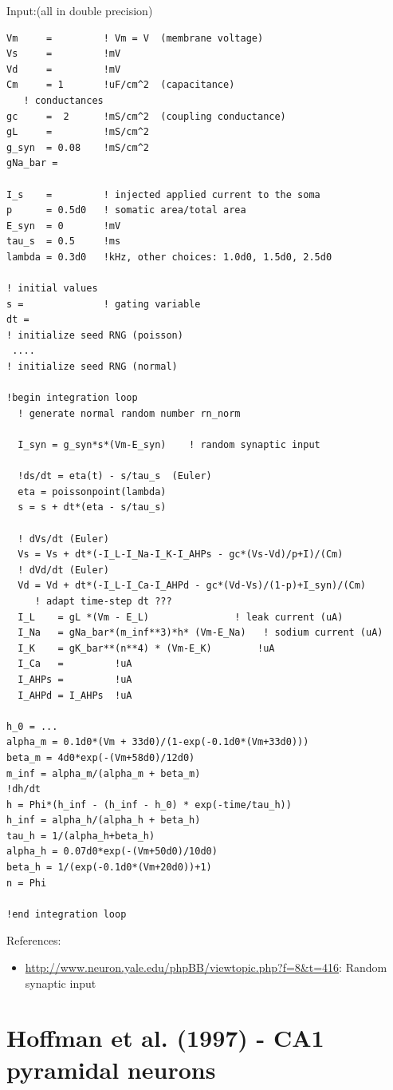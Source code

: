 Input:(all in double precision)
\begin{verbatim}
Vm     =         ! Vm = V  (membrane voltage)
Vs     =         !mV
Vd     =         !mV
Cm     = 1       !uF/cm^2  (capacitance)
   ! conductances
gc     =  2      !mS/cm^2  (coupling conductance)
gL     =         !mS/cm^2
g_syn  = 0.08    !mS/cm^2
gNa_bar =

I_s    =         ! injected applied current to the soma
p      = 0.5d0   ! somatic area/total area
E_syn  = 0       !mV
tau_s  = 0.5     !ms
lambda = 0.3d0   !kHz, other choices: 1.0d0, 1.5d0, 2.5d0

! initial values
s =              ! gating variable
dt = 
! initialize seed RNG (poisson)
 ....
! initialize seed RNG (normal)

!begin integration loop
  ! generate normal random number rn_norm
  
  I_syn = g_syn*s*(Vm-E_syn)    ! random synaptic input

  !ds/dt = eta(t) - s/tau_s  (Euler)
  eta = poissonpoint(lambda)  
  s = s + dt*(eta - s/tau_s)

  ! dVs/dt (Euler)
  Vs = Vs + dt*(-I_L-I_Na-I_K-I_AHPs - gc*(Vs-Vd)/p+I)/(Cm)
  ! dVd/dt (Euler)
  Vd = Vd + dt*(-I_L-I_Ca-I_AHPd - gc*(Vd-Vs)/(1-p)+I_syn)/(Cm)
     ! adapt time-step dt ???
  I_L    = gL *(Vm - E_L)               ! leak current (uA)
  I_Na   = gNa_bar*(m_inf**3)*h* (Vm-E_Na)   ! sodium current (uA)
  I_K    = gK_bar**(n**4) * (Vm-E_K)        !uA
  I_Ca   =         !uA
  I_AHPs =         !uA
  I_AHPd = I_AHPs  !uA

h_0 = ...
alpha_m = 0.1d0*(Vm + 33d0)/(1-exp(-0.1d0*(Vm+33d0)))
beta_m = 4d0*exp(-(Vm+58d0)/12d0)
m_inf = alpha_m/(alpha_m + beta_m)
!dh/dt
h = Phi*(h_inf - (h_inf - h_0) * exp(-time/tau_h))
h_inf = alpha_h/(alpha_h + beta_h)
tau_h = 1/(alpha_h+beta_h)
alpha_h = 0.07d0*exp(-(Vm+50d0)/10d0)
beta_h = 1/(exp(-0.1d0*(Vm+20d0))+1)
n = Phi
 
!end integration loop
\end{verbatim}


References:
\begin{itemize}
\item \url{http://www.neuron.yale.edu/phpBB/viewtopic.php?f=8&t=416}:
  Random synaptic input 
\end{itemize}


\section{Hoffman et al. (1997) - CA1 pyramidal neurons}
\label{sec:Hoffman-1997-pyramidal-CA1}

